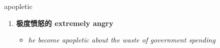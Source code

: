 
\begin{frame}
{\huge apopletic}
\begin{center}
\begin{enumerate}\Large
  \item \textbf{极度愤怒的 extremely angry}
  \begin{itemize}
    \item \em{\Large{he become apopletic about the waste of government spending}}
  \end{itemize}
\end{enumerate}
\end{center}
\end{frame}
